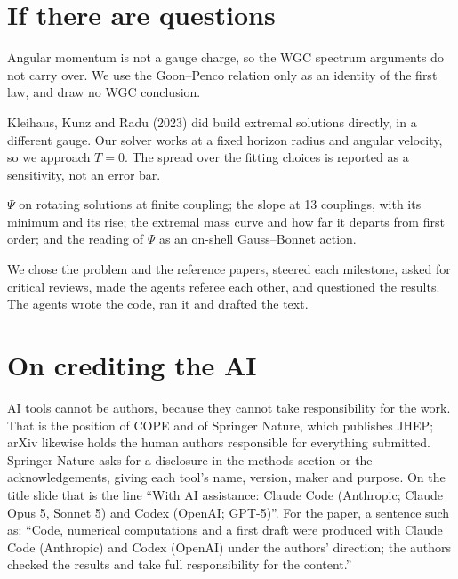 \documentclass[12pt,a4paper]{article}
\begin{document}
\newpage
\section*{If there are questions}

\begin{description}[leftmargin=0pt,style=nextline]
\item[Why is $J$ not like a charge, for the weak gravity conjecture?]
Angular momentum is not a gauge charge, so the WGC spectrum arguments do not
carry over. We use the Goon--Penco relation only as an identity of the first law,
and draw no WGC conclusion.
\item[Why not solve directly at $T=0$?]
Kleihaus, Kunz and Radu (2023) did build extremal solutions directly, in a
different gauge. Our solver works at a fixed horizon radius and angular velocity,
so we approach $T=0$. The spread over the fitting choices is reported as a
sensitivity, not an error bar.
\item[What exactly is new?]
$\Psi$ on rotating solutions at finite coupling; the slope at 13 couplings, with its
minimum and its rise; the extremal mass curve and how far it departs from first
order; and the reading of $\Psi$ as an on-shell Gauss--Bonnet action.
\item[Which parts did the humans do?]
We chose the problem and the reference papers, steered each milestone, asked for
critical reviews, made the agents referee each other, and questioned the results.
The agents wrote the code, ran it and drafted the text.
\end{description}

\section*{On crediting the AI}

AI tools cannot be authors, because they cannot take responsibility for the work.
That is the position of COPE and of Springer Nature, which publishes JHEP; arXiv
likewise holds the human authors responsible for everything submitted. Springer
Nature asks for a disclosure in the methods section or the acknowledgements, giving
each tool's name, version, maker and purpose. On the
title slide that is the line ``With AI assistance: Claude Code (Anthropic; Claude
Opus 5, Sonnet 5) and Codex (OpenAI; GPT-5)''. For the paper, a sentence such as:
``Code, numerical computations and a first draft were produced with Claude Code
(Anthropic) and Codex (OpenAI) under the authors' direction; the authors checked
the results and take full responsibility for the content.''
\end{document}
